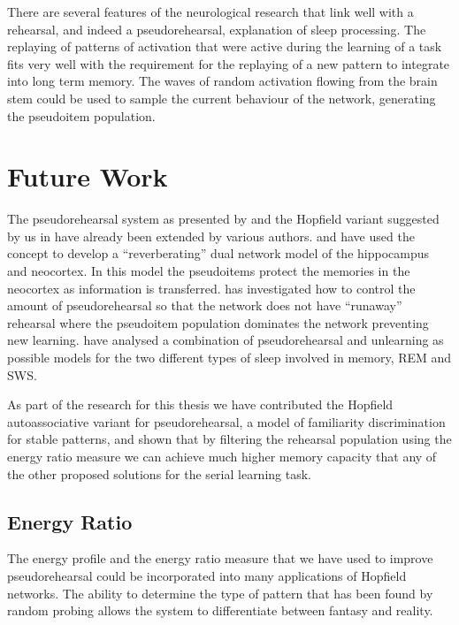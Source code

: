 There are several features of the neurological research that link well with a rehearsal, and indeed a pseudorehearsal, explanation of sleep processing.  The replaying of patterns of activation that were active during the learning of a task \citep{Pennartz2002,Peigneux2004} fits very well with the requirement for the replaying of a new pattern to integrate into long term memory.  The waves of random activation flowing from the brain stem could be used to sample the current behaviour of the network, generating the pseudoitem population.


\section{Future Work}

The pseudorehearsal system as presented by \citet{Robins1996} and the Hopfield variant suggested by us in \cite{Robins1998} have already been extended by various authors.
\citet{French1997} and \citet{Ans1997} have used the concept to develop a ``reverberating'' dual network model of the hippocampus and neocortex.  In this model the pseudoitems protect the memories in the neocortex as information is transferred. \citet{Meeter2003} has investigated how to control the amount of pseudorehearsal so that the network does not have ``runaway'' rehearsal where the pseudoitem population dominates the network preventing new learning. \citet{Walker2004b} have analysed a combination of pseudorehearsal and unlearning as possible models for the two different types of sleep involved in memory, REM and SWS.

As part of the research for this thesis we have contributed the Hopfield autoassociative variant for pseudorehearsal, a model of familiarity discrimination for stable patterns, and shown that by filtering the rehearsal population using the energy ratio measure we can achieve much higher memory capacity that any of the other proposed solutions for the serial learning task.  

\subsection{Energy Ratio}

The energy profile and the energy ratio measure that we have used to improve pseudorehearsal could be incorporated into many applications of Hopfield networks.  The ability to determine the type of pattern that has been found by random probing allows the system to differentiate between fantasy and reality. 


